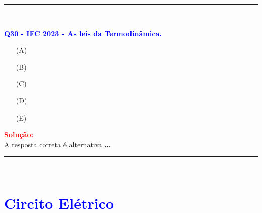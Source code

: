 \documentclass[a4paper,12pt]{article}
\begin{document}
\noindent\rule{\linewidth}{0.6pt}\\

\begin{flushleft}
\textbf{\textcolor{blue}{\Large Q30 - IFC 2023 - As leis da Termodinâmica.}}\\
\noindent

\begin{itemize}
\item[(A)] 
\item[(B)] 
\item[(C)] 
\item[(D)] 
\item[(E)] 
\end{itemize}

\vspace{0.5cm}

\textcolor{red}{\textbf{Solução:}}\\


A resposta correta é alternativa \colorbox{green!50}{\textbf{...}}.
\end{flushleft}

\noindent\rule{\linewidth}{0.6pt}\\

\section{\large \textcolor{blue}{Circito El\'etrico}}
\end{document}
